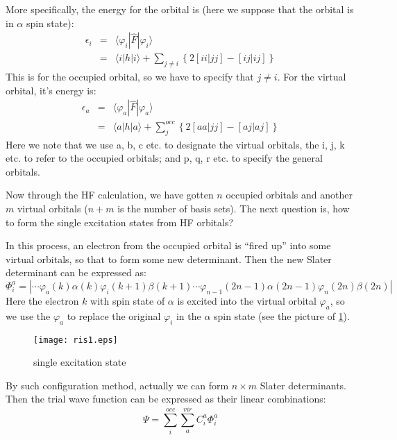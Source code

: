 More specifically, the energy for the orbital is (here we suppose that
the orbital is in $\alpha$ spin state):
\begin{eqnarray}\label{CISeq:3}
  \epsilon_{i} &=&  \langle \varphi_{i}| \hat{F} | \varphi_{i} \rangle \nonumber \\
  &=& \langle i|h|i \rangle + \sum_{j \neq i} \left\{
    2[ii|jj] - [ij|ij]
  \right\}
\end{eqnarray}
This is for the occupied orbital, so we have to specify that $j \neq
i$. For the virtual orbital, it's energy is:
\begin{eqnarray}\label{CISeq:4}
  \epsilon_{a} &=&  \langle \varphi_{a}| \hat{F} | \varphi_{a} \rangle \nonumber \\
  &=& \langle a|h|a \rangle + \sum_{j}^{occ} \left\{
    2[aa|jj] - [aj|aj]
  \right\}
\end{eqnarray}
Here we note that we use a, b, c etc. to designate the virtual
orbitals, the i, j, k etc. to refer to the occupied orbitals; and p,
q, r etc. to specify the general orbitals.

Now through the HF calculation, we have gotten $n$ occupied orbitals
and another $m$ virtual orbitals ($n+m$ is the number of basis
sets). The next question is, how to form the single excitation states
from HF orbitals?

In this process, an electron from the occupied orbital is ``fired up''
into some virtual orbitals, so that to form some new determinant. Then
the new Slater determinant can be expressed as:
\begin{equation}
    \label{eq:CISeq:5}
  \Phi_{i}^{a} =  |\cdots\varphi_{a}(k)\alpha(k)\varphi_{i}(k+1)\beta(k+1)\cdots
\varphi_{n-1}(2n-1)\alpha(2n-1)\varphi_{n}(2n)\beta(2n)|  
\end{equation}
Here the electron $k$ with spin state of $\alpha$ is excited into the
virtual orbital $\varphi_{a}$, so we use the $\varphi_{a}$ to replace
the original $\varphi_{i}$ in the $\alpha$ spin state (see the picture
of \ref{ris_pic}). 
\begin{figure}[htbp]
\begin{center}
\texttt{[image: ris1.eps]}\label{ris_pic}
\caption{single excitation state}
\end{center}
\end{figure}

By such configuration method, actually we can form $n\times m$ Slater
determinants. Then the trial wave function can be expressed as their
linear combinations:
\begin{equation}
  \label{CISeq:6}
  \Psi = \sum_{i}^{occ}\sum_{a}^{vir}C_{i}^{a}\Phi_{i}^{a}
\end{equation}

